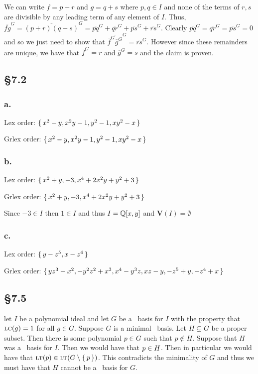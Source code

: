 \documentclass[letterpaper]{article}
\begin{document}
We can write $f = p + r$ and $g = q + s$ where $p, q \in I$ and none of the terms of $r, s$ are divisible by any leading term of any element of $I$.
Thus, $\overline{fg}^G = \overline{(p + r)(q + s)}^G = \overline{pq}^G + \overline{qr}^G + \overline{ps}^G + \overline{rs}^G$.
Clearly $\overline{pq}^G = \overline{qr}^G = \overline{ps}^G = 0$ and so we just need to show that $ \overline{\overline{f}^G \overline{g}^G}^G = \overline{rs}^G$.
However since these remainders are unique, we have that $\overline{f}^{G} = r$ and $\overline{g}^{G} = s$ and the claim is proven.

\subsection*{\S 7.2}

\subsubsection*{a.}

Lex order: $\set{x^{2} - y, x^{2} y - 1, y^{2} - 1, x y^{2} - x}$

Grlex order: $\set{x^{2} - y, x^{2} y - 1, y^{2} - 1, x y^{2} - x}$

\subsubsection*{b.}

Lex order: $\set{x^{2} + y, -3, x^{4} + 2 x^{2} y + y^{2} + 3}$

Grlex order: $\set{x^{2} + y, -3, x^{4} + 2 x^{2} y + y^{2} + 3}$

Since $-3 \in I$ then $1 \in I$ and thus $I = \Q\bqty{x, y}$ and $\textbf{V}(I) = \emptyset$

\subsubsection*{c.}

Lex order: $\set{y - z^{5}, x - z^{4}}$

Grlex order: $\set{y z^{3} - x^{2}, -y^{2} z^{2} + x^{3}, x^{4} - y^{3} z, x z - y, -z^{5} + y, -z^{4} + x}$

\subsection*{\S 7.5}

let $I$ be a polynomial ideal and let $G$ be a \Grobner\ basis for $I$ with the property that $\operatorname{\textsc{lc}}(g) = 1$ for all $g \in G$.
Suppose $G$ is a minimal \Grobner\ basis.
Let $H \subsetneq G$ be a proper subset.
Then there is some polynomial $p \in G$ such that $p \notin H$.
Suppose that $H$ was a \Grobner\ basis for $I$.
Then we would have that $p \in \gen{H}$.
Then in particular we would have that $\lt(p) \in \gen{\lt(G \setminus \set{p})}$.
This contradicts the minimality of $G$ and thus we must have that $H$ cannot be a \Grobner\ basis for $G$.
\end{document}
